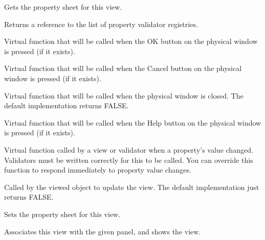 
Gets the property sheet for this view.

\label{wxpropertyviewgetregistrylist}


Returns a reference to the list of property validator registries.

\label{wxpropertyviewonok}


Virtual function that will be called when the OK button on the physical window is pressed (if it exists).

\label{wxpropertyviewoncancel}


Virtual function that will be called when the Cancel button on the physical window is pressed (if it exists).

\label{wxpropertyviewonclose}


Virtual function that will be called when the physical window is closed. The default implementation returns FALSE.

\label{wxpropertyviewonhelp}


Virtual function that will be called when the Help button on the physical window is pressed (if it exists).

\label{wxpropertyviewonpropertychanged}


Virtual function called by a view or validator when a property's value changed. Validators
must be written correctly for this to be called. You can override this function
to respond immediately to property value changes.

\label{wxpropertyviewonupdateview}


Called by the viewed object to update the view. The default implementation just returns
FALSE.

\label{wxpropertyviewsetpropertysheet}


Sets the property sheet for this view.

\label{wxpropertyviewshowview}


Associates this view with the given panel, and shows the view.

